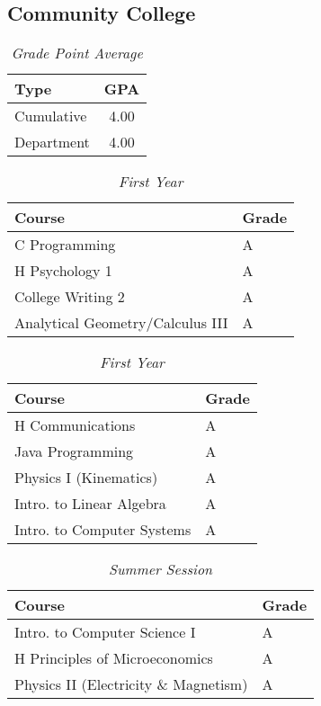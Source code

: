 \documentclass[12pt]{article}
\renewcommand{\it}[1]{\textit{{#1}}}
\begin{document}
\subsection{Community College}
\begin{table}[H]
  \centering
  \caption*{\it{Grade Point Average}}
  \vspace{-0.8em}
  \begin{tabular}{l|c}
    Type     & GPA  \\
    \hline
    Cumulative & 4.00 \\
    Department & 4.00 \\
  \end{tabular}
  \vspace{-1em}
\end{table}
\begin{table}[H]
  \centering
  \caption*{\it{First Year}}
  \vspace{-0.8em}
  \begin{tabular}{l|l}
    Course                               & Grade \\
    \hline
    C Programming                        & A \\
    H Psychology 1                       & A \\
    College Writing 2                    & A \\
    Analytical Geometry/Calculus III     & A \\
  \end{tabular}
  \hfill
  \begin{tabular}{l|l}
    Course                           & Grade \\
    \hline
    H Communications                 & A \\
    Java Programming                 & A \\
    Physics I (Kinematics)           & A \\
    Intro. to Linear Algebra         & A \\
    Intro. to Computer Systems       & A \\
  \end{tabular}
  \vspace{-1em}
\end{table}

\begin{table}[H]
  \centering
  \vspace{-0.8em}
  \caption*{\it{Summer Session}}
  \begin{tabular}{l|l}
    Course                                 & Grade \\
    \hline
    Intro. to Computer Science I           & A \\
    H Principles of Microeconomics         & A \\
    Physics II (Electricity \& Magnetism)  & A \\
  \end{tabular}
  \vspace{-1em}
\end{table}
\end{document}
